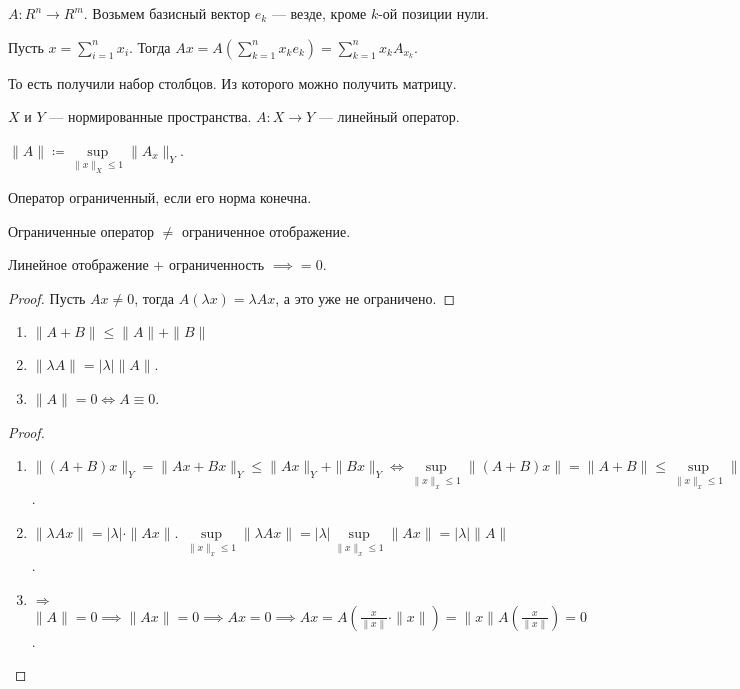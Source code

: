 \begin{definition}
    $A\!: R^n \to R^m$. Возьмем базисный вектор  $e_k$ --- везде, кроме  $k$-ой позиции нули.

    Пусть  $x = \sum\limits_{i=1}^n x_i$. Тогда  $Ax = A(\sum\limits_{k=1}^n x_k e_k) = \sum\limits_{k=1}^n x_k A_{x_k}$. 

    То есть получили набор столбцов. Из которого можно получить матрицу. 
\end{definition}
\begin{definition}
    $X$ и  $Y$ --- нормированные пространства.  $A\!: X \to Y$ --- линейный оператор.

     $\| A \| \coloneqq \sup\limits_{\|x\|_X \le 1} \|A_x \|_Y$.

     Оператор ограниченный, если его норма конечна.
\end{definition}
\begin{remark}
    Ограниченные оператор $\neq$ ограниченное отображение. 

    Линейное отображение + ограниченность  $\implies = 0$.

\end{remark}
\begin{proof}
    Пусть $Ax \neq 0$, тогда  $A(\lambda x) = \lambda Ax$, а это уже не ограничено.
\end{proof}
\begin{properties}
    \begin{enumerate}
        \item $\| A + B \| \le \| A \| + \| B \|$
        \item $\| \lambda A \| = |\lambda| \|A \|$.
        \item  $\|A\| = 0 \iff A \equiv 0$.
    \end{enumerate}
\end{properties}
\begin{proof}
    \begin{enumerate}
        \item $\|(A+B)x\|_Y = \|Ax + Bx\|_Y \le \|Ax\|_Y + \|Bx\|_Y \iff \sup\limits_{\| x\|_x \le 1} \|(A+B)x\| = \|A+B\| \le \sup\limits_{\| x\|_x \le 1} \|Ax\|_Y + \sup\limits_{\| x\|_x \le 1} \|Bx\|_Y = \|A\| + \|B\|$.
        \item $\| \lambda Ax \| = |\lambda| \cdot \|Ax \|$.  $\sup\limits_{\| x\|_x \le 1} \|\lambda A x \| = |\lambda| \sup\limits_{\| x\|_x \le 1} \| Ax\| = |\lambda| \| A\|$.
        \item $\Rightarrow$  $\|A\| = 0 \implies \|Ax\| = 0 \implies Ax = 0 \implies Ax = A(\frac{x}{\| x\|} \cdot \|x \|) = \|x\| A(\frac{x}{\|x\|}) = 0$.
    \end{enumerate}
\end{proof}
